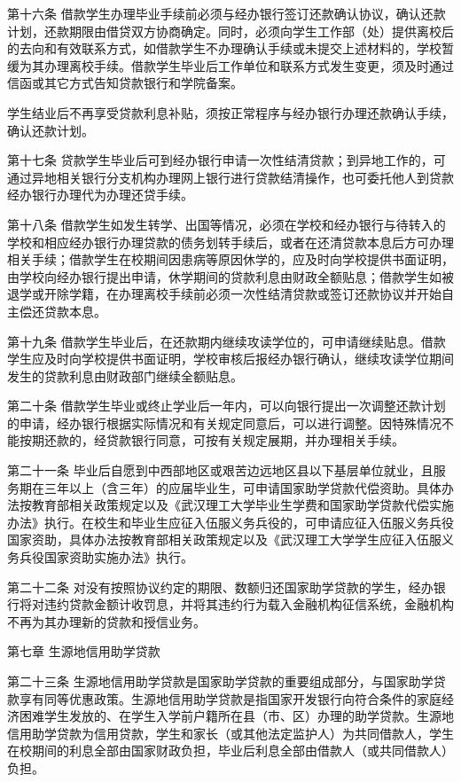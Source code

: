 \documentclass[UTF8,12pt,a4paper]{report}
\begin{document}
第十六条 借款学生办理毕业手续前必须与经办银行签订还款确认协议，确认还款计划，还款期限由借贷双方协商确定。同时，必须向学生工作部（处）提供离校后的去向和有效联系方式，如借款学生不办理确认手续或未提交上述材料的，学校暂缓为其办理离校手续。借款学生毕业后工作单位和联系方式发生变更，须及时通过信函或其它方式告知贷款银行和学院备案。

学生结业后不再享受贷款利息补贴，须按正常程序与经办银行办理还款确认手续，确认还款计划。

第十七条 贷款学生毕业后可到经办银行申请一次性结清贷款；到异地工作的，可通过异地相关银行分支机构办理网上银行进行贷款结清操作，也可委托他人到贷款经办银行办理代为办理还贷手续。

第十八条 借款学生如发生转学、出国等情况，必须在学校和经办银行与待转入的学校和相应经办银行办理贷款的债务划转手续后，或者在还清贷款本息后方可办理相关手续；借款学生在校期间因患病等原因休学的，应及时向学校提供书面证明，由学校向经办银行提出申请，休学期间的贷款利息由财政全额贴息；借款学生如被退学或开除学籍，在办理离校手续前必须一次性结清贷款或签订还款协议并开始自主偿还贷款本息。

第十九条 借款学生毕业后，在还款期内继续攻读学位的，可申请继续贴息。借款学生应及时向学校提供书面证明，学校审核后报经办银行确认，继续攻读学位期间发生的贷款利息由财政部门继续全额贴息。

第二十条 借款学生毕业或终止学业后一年内，可以向银行提出一次调整还款计划的申请，经办银行根据实际情况和有关规定同意后，可以进行调整。因特殊情况不能按期还款的，经贷款银行同意，可按有关规定展期，并办理相关手续。

第二十一条 毕业后自愿到中西部地区或艰苦边远地区县以下基层单位就业，且服务期在三年以上（含三年）的应届毕业生，可申请国家助学贷款代偿资助。具体办法按教育部相关政策规定以及《武汉理工大学毕业生学费和国家助学贷款代偿实施办法》执行。在校生和毕业生应征入伍服义务兵役的，可申请应征入伍服义务兵役国家资助，具体办法按教育部相关政策规定以及《武汉理工大学学生应征入伍服义务兵役国家资助实施办法》执行。

第二十二条 对没有按照协议约定的期限、数额归还国家助学贷款的学生，经办银行将对违约贷款金额计收罚息，并将其违约行为载入金融机构征信系统，金融机构不再为其办理新的贷款和授信业务。

第七章 生源地信用助学贷款

第二十三条 生源地信用助学贷款是国家助学贷款的重要组成部分，与国家助学贷款享有同等优惠政策。生源地信用助学贷款是指国家开发银行向符合条件的家庭经济困难学生发放的、在学生入学前户籍所在县（市、区）办理的助学贷款。生源地信用助学贷款为信用贷款，学生和家长（或其他法定监护人）为共同借款人，学生在校期间的利息全部由国家财政负担，毕业后利息全部由借款人（或共同借款人）负担。
\end{document}
